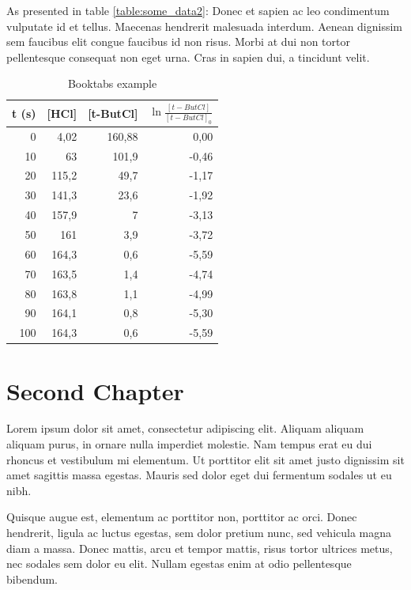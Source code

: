 \documentclass[11pt,a4paper,oneside,article]{memoir}
\begin{document}
As presented in table \ref{table:some_data2}: Donec et sapien ac leo condimentum vulputate id et tellus. Maecenas hendrerit malesuada interdum. Aenean dignissim sem faucibus elit congue faucibus id non risus. Morbi at dui non tortor pellentesque consequat non eget urna. Cras in sapien dui, a tincidunt velit.

\begin{table}[htbp]
  \centering
  \caption{Booktabs example}
    \begin{tabular}{rrrr}
    \toprule
    t (s) & [HCl] & [t-ButCl] & $\ln\frac{[t-ButCl]}{[t-ButCl]_0}$ \\
    \midrule
    0     & 4,02  & 160,88 & 0,00 \\
    10    & 63    & 101,9 & -0,46 \\
    20    & 115,2 & 49,7  & -1,17 \\
    30    & 141,3 & 23,6  & -1,92 \\
    40    & 157,9 & 7     & -3,13 \\
    50    & 161   & 3,9   & -3,72 \\
    60    & 164,3 & 0,6   & -5,59 \\
    70    & 163,5 & 1,4   & -4,74 \\
    80    & 163,8 & 1,1   & -4,99 \\
    90    & 164,1 & 0,8   & -5,30 \\
    100   & 164,3 & 0,6   & -5,59 \\
    \bottomrule
    \end{tabular}
  \label{tab:thisislabel}
\end{table}

\chapter{Second Chapter}

Lorem ipsum dolor sit amet, consectetur adipiscing elit. Aliquam aliquam aliquam purus, in ornare nulla imperdiet molestie. Nam tempus erat eu dui rhoncus et vestibulum mi elementum. Ut porttitor elit sit amet justo dignissim sit amet sagittis massa egestas. Mauris sed dolor eget dui fermentum sodales ut eu nibh. 

Quisque augue est, elementum ac porttitor non, porttitor ac orci. Donec hendrerit, ligula ac luctus egestas, sem dolor pretium nunc, sed vehicula magna diam a massa. Donec mattis, arcu et tempor mattis, risus tortor ultrices metus, nec sodales sem dolor eu elit. Nullam egestas enim at odio pellentesque bibendum. 
\end{document}
